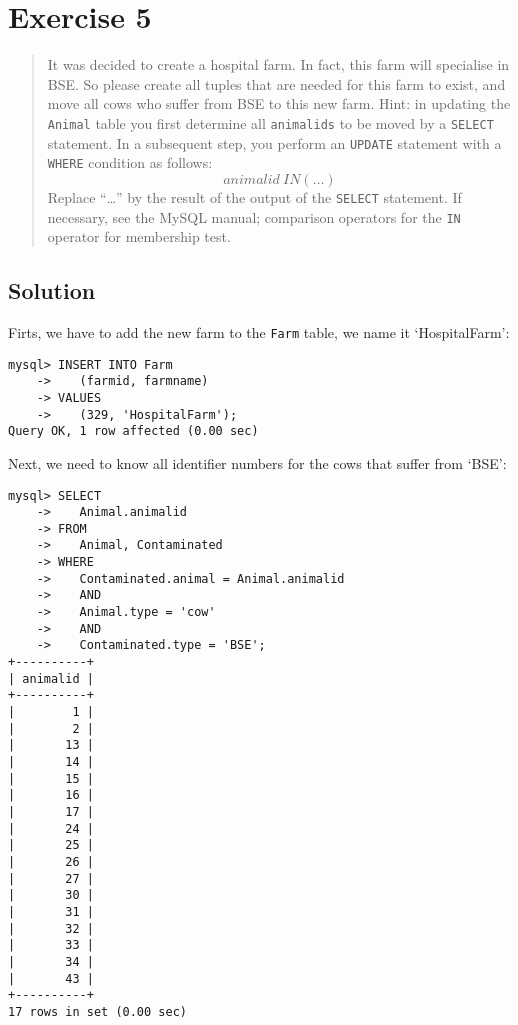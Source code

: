 \documentclass[11pt]{article}
\begin{document}
\newpage

\section{Exercise 5}

\begin{quote}
It was decided to create a hospital farm. In fact, this farm will specialise in BSE. So please create all tuples that are needed for this farm to exist, and move all cows who suffer from BSE to this new farm. Hint: in updating the \verb|Animal| table you first determine all \verb|animalids| to be moved by a \verb|SELECT| statement. In a subsequent step, you perform an \verb|UPDATE| statement with a \verb|WHERE| condition as follows:
\begin{displaymath}
animalid\ IN(\ldots)
\end{displaymath}
Replace ``\ldots'' by the result of the output of the \verb|SELECT| statement. If necessary, see the
MySQL manual; comparison operators for the \verb|IN| operator for membership test.
\end{quote}

\subsection*{Solution}

Firts, we have to add the new farm to the \verb|Farm| table, we name it `HospitalFarm':

\begin{verbatim}
mysql> INSERT INTO Farm
    ->    (farmid, farmname)
    -> VALUES
    ->    (329, 'HospitalFarm');
Query OK, 1 row affected (0.00 sec)
\end{verbatim}

Next, we need to know all identifier numbers for the cows that suffer from `BSE':

\newpage

\begin{verbatim}
mysql> SELECT
    ->    Animal.animalid
    -> FROM
    ->    Animal, Contaminated
    -> WHERE
    ->    Contaminated.animal = Animal.animalid
    ->    AND
    ->    Animal.type = 'cow'
    ->    AND
    ->    Contaminated.type = 'BSE';
+----------+
| animalid |
+----------+
|        1 |
|        2 |
|       13 |
|       14 |
|       15 |
|       16 |
|       17 |
|       24 |
|       25 |
|       26 |
|       27 |
|       30 |
|       31 |
|       32 |
|       33 |
|       34 |
|       43 |
+----------+
17 rows in set (0.00 sec)
\end{verbatim}
\end{document}
